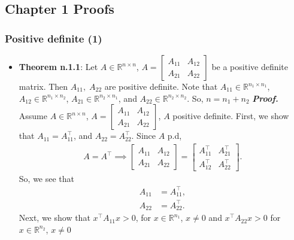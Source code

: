 \documentclass{report}
\begin{document}
    \pagebreak 
    \subsection{Chapter 1 Proofs}
    \bigbreak \noindent 
    \subsubsection{Positive definite (1)}
    \begin{itemize}
        \item \textbf{Theorem n.1.1}: Let $A\in \mathbb{R}^{n\times n}$, $ A = \begin{bmatrix} A_{11} & A_{12} \\ A_{21} & A_{22} \end{bmatrix} $ be a positive definite matrix. Then $A_{11}, \; A_{22}$ are positive definite.
            \bigbreak \noindent 
            Note that $A_{11} \in \mathbb{R}^{n_{1} \times n_{1}}$, $A_{12} \in \mathbb{R}^{n_{1} \times n_{2}}$, $A_{21} \in \mathbb{R}^{n_{2} \times n_{1}}$, and $A_{22} \in \mathbb{R}^{n_{2} \times n_{2}}$. So, $n = n_{1} + n_{2} $
            \bigbreak \noindent 
            \textbf{\textit{Proof.}} Assume $A \in \mathbb{R}^{n\times n}$, $A = \begin{bmatrix} A_{11} & A_{12} \\ A_{21} & A_{22} \end{bmatrix} $, $A$ positive definite.
            \bigbreak \noindent
            First, we show that $A_{11} = A_{11}^{\top}$, and $A_{22} = A_{22}^{\top}$. Since $A$ p.d, 
            \begin{align*}
                A = A^{\top} \implies \begin{bmatrix} A_{11} & A_{12} \\ A_{21} & A_{22} \end{bmatrix} = \begin{bmatrix} A_{11}^{\top} & A_{21}^{\top} \\ A_{12}^{\top} & A_{22}^{\top} \end{bmatrix}
            .\end{align*}
            So, we see that
            \begin{align*}
                A_{11} &= A_{11}^{\top}, \\
                A_{22} &= A_{22}^{\top}
            .\end{align*}
            \bigbreak \noindent 
            Next, we show that $x^{\top}A_{11}x >0$, for $x \in \mathbb{R}^{n_{1}}$, $x\ne 0$ and $x^{\top}A_{22} x > 0$ for $x \in \mathbb{R}^{n_{2}} $, $x \ne 0 $

\end{itemize}
\end{document}
